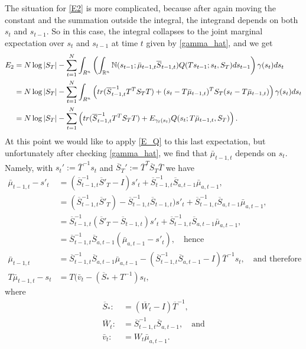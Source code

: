 \documentclass[12pt,leqno]{article}
\begin{document}
The situation for \eqref{E2} is more complicated, because after again moving the constant and the summation outside
the integral, the integrand depends on both $s_t$ and $s_{t-1}$.  So in this case, the integral collapses to the 
joint marginal expectation over $s_t$ and $s_{t-1}$ at time $t$ given by \eqref{gamma_hat}, and we get
\begin{equation}\label{E2:1}
  \begin{split}
    E_2 &= N\log|S_T| - \sum_{t=1}^N\int_{R^n}\left(\int_{{\mathbb R}^{n}}{\mathbb N}(s_{t-1};\bar{\mu}_{t-1,t}\overline{S}_{t-1,t})Q(Ts_{t-1};s_t,S_T)ds_{t-1}\right)\gamma(s_t)ds_t\\
    &= N\log|S_T|-\sum_{t=1}^N\int_{R^n}\left(tr(\overline{S}_{t-1,t}^{-1}T^TS_TT) +
    (s_t - T\bar{\mu}_{t-1,t})^TS_T(s_t-T\bar{\mu}_{t-1,t})\right)\gamma(s_t)ds_t\\
    &= N\log|S_T|-\sum_{t=1}^N\left(tr(\overline{S}_{t-1,t}^{-1}T^TS_TT) + E_{\gamma_t(s_t)}Q(s_t;T\bar{\mu}_{t-1,t},S_T)\right).\\
    \end{split}
\end{equation}
At this point we would like to apply \eqref{E_Q} to this last expectation, but unfortunately after checking \eqref{gamma_hat},
we find that $\bar{\mu}_{t-1,t}$ depends on $s_t$.  Namely, with $s_t' := \overline{T}^{-1}s_t$ and
$\overline{S}_T' := \overline{T}^T\overline{S}_T\overline{T}$ we have
\begin{align*}
\bar{\mu}_{t-1,t}-s'_t &= (\overline{S}_{t-1,t}^{-1}\overline{S}'_T - I)s'_t +
  \overline{S}_{t-1,t}^{-1}\overline{S}_{a,t-1}\bar{\mu}_{a,t-1}, \\
  &= (\overline{S}_{t-1,t}^{-1}\overline{S}'_T) - \overline{S}_{t-1,t}^{-1}\overline{S}_{t-1,t})s'_t +
  \overline{S}_{t-1,t}^{-1}\overline{S}_{a,t-1}\bar{\mu}_{a,t-1}, \\
    &= \overline{S}_{t-1,t}^{-1}(\overline{S}'_T - \overline{S}_{t-1,t} )s'_t + \overline{S}_{t-1,t}^{-1}\overline{S}_{a,t-1}\bar{\mu}_{a,t-1}, \\
    &= \overline{S}_{t-1,t}^{-1}\overline{S}_{a,t-1}(\bar{\mu}_{a,t-1}-s'_t), \quad\text{hence}\\
    \bar{\mu}_{t-1,t} &= \overline{S}_{t-1,t}^{-1}\overline{S}_{a,t-1}\bar{\mu}_{a,t-1} - (\overline{S}_{t-1,t}^{-1}\overline{S}_{a,t-1}-I)\overline{T}^{-1}s_t,\quad\text{and therefore}\\
    T\bar{\mu}_{t-1,t} - s_t &= T(\bar{v}_t - (\overline{S}_* + T^{-1})s_t, 
  \end{align*}
where
\begin{align*}
  \overline{S}_* :&= (\overline{W}_t - I)\overline{T}^{-1} ,\\
  \overline{W}_t :&= \overline{S}_{t-1,t}^{-1}\overline{S}_{a,t-1},\quad\text{and}\\
  \bar{v}_t :&= W_t\bar{\mu}_{a,t-1}.
\end{align*}
\end{document}
